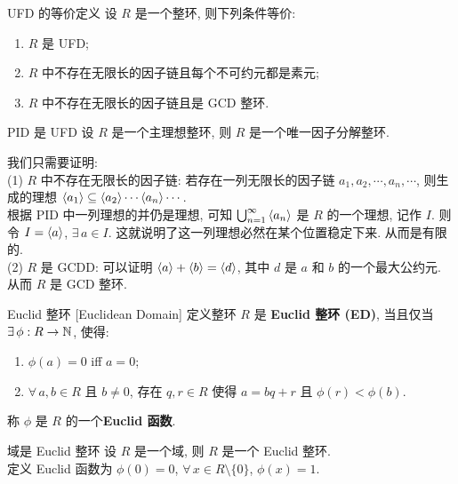         \begin{thm}
            {UFD 的等价定义}
            设 \(R\) 是一个整环, 则下列条件等价:
            \begin{enumerate}
                \item \(R\) 是 UFD;
                \item \(R\) 中不存在无限长的因子链且每个不可约元都是素元;
                \item \(R\) 中不存在无限长的因子链且是 GCD 整环.
            \end{enumerate}
        \end{thm}

        \begin{thm}
            {PID 是 UFD}
            设 \(R\) 是一个主理想整环, 则 \(R\) 是一个唯一因子分解整环.
        \end{thm}

        \begin{prf}
            我们只需要证明: \\
            (1) \(R\) 中不存在无限长的因子链: 若存在一列无限长的因子链 \(a_1,a_2,\cdots,a_n,\cdots\), 则生成的理想 \(\expval{a_1}\subseteq\expval{a_2}\cdots\expval{a_n}\cdots \).\\
            根据 PID 中一列理想的并仍是理想, 可知 \(\bigcup_{n=1}^{\infty} \expval{a_n}\) 是 \(R\) 的一个理想, 记作 \(I\). 则令 \(I=\expval{a}\), \(\exists\,a\in I\). 这就说明了这一列理想必然在某个位置稳定下来. 从而是有限的.\\
            (2) \(R\) 是 GCDD: 可以证明 \(\expval{a}+\expval{b}=\expval{d}\), 其中 \(d\) 是 \(a\) 和 \(b\) 的一个最大公约元. 从而 \(R\) 是 GCD 整环. 
        \end{prf}

        \begin{dfn}
            {Euclid 整环}
            [Euclidean Domain]
            定义整环 \(R\) 是 \textbf{Euclid 整环 (ED)}, 当且仅当 \(\exists\,\phi:R\to\operatorname{\mathbb{N}}\), 使得:
            \begin{enumerate}
                \item \(\phi(a)=0\) iff \(a=0\);
                \item \(\forall\,a,b\in R\) 且 \(b\neq 0\), 存在 \(q,r\in R\) 使得 \(a=bq+r\) 且 \(\phi(r)<\phi(b)\).
            \end{enumerate}
            称 \(\phi\) 是 \(R\) 的一个\textbf{Euclid 函数}.
        \end{dfn}

        \begin{ppt}
            {域是 Euclid 整环}
            设 \(R\) 是一个域, 则 \(R\) 是一个 Euclid 整环.\\
            定义 Euclid 函数为 \(\phi(0)=0\), \(\forall\,x\in R\setminus\{0\}\), \(\phi(x)=1\).
        \end{ppt}

